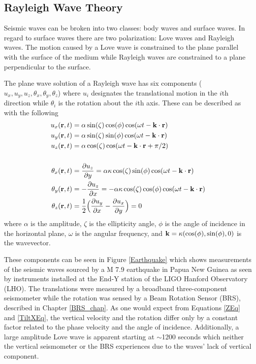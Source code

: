 \documentclass [12pt, proquest]{uwthesis}[2019]
\begin{document}
\subsection{Rayleigh Wave Theory}

Seismic waves can be broken into two classes: body waves and surface waves. In regard to surface waves there are two polarization: Love waves and Rayleigh waves. The motion caused by a Love wave is constrained to the plane parallel with the surface of the medium while Rayleigh waves are constrained to a plane perpendicular to the surface. 

The plane wave solution of a Rayleigh wave has six components ($u_x, u_y, u_z, \theta_x, \theta_y, \theta_z$) where $u_i$ designates the translational motion in the $i$th direction while $\theta_i$ is the rotation about the $i$th axis.
These can be described as with the following~\cite{seismic}
\begin{align}
u_x({\bf r} ,t)&=\alpha \sin(\zeta) \cos(\phi) \cos(\omega t-{\bf k}\cdot{\bf r})\label{XEq}\\
u_y({\bf r} ,t)&=\alpha \sin(\zeta) \sin(\phi) \cos(\omega t-{\bf k}\cdot{\bf r})\\
u_z({\bf r} ,t)&=\alpha \cos(\zeta) \cos(\omega t-{\bf k}\cdot{\bf r}+\pi/2)\label{ZEq}\\
\notag \\
\theta_x({\bf r} ,t)&=\frac{\partial u_z}{\partial y}=\alpha \kappa \cos(\zeta) \sin(\phi) \cos(\omega t-{\bf k}\cdot{\bf r})\label{TiltXEq}\\
\theta_y({\bf r} ,t)&=-\frac{\partial u_z}{\partial x}=-\alpha \kappa \cos(\zeta) \cos(\phi) \cos(\omega t-{\bf k}\cdot{\bf r})\\
\theta_z({\bf r} ,t)&=\frac{1}{2}\Big(\frac{\partial u_y}{\partial x}-\frac{\partial u_x}{\partial y}\Big)=0
\end{align}
where $\alpha$ is the amplitude, $\zeta$ is the ellipticity angle, $\phi$ is the angle of incidence in the horizontal plane, $\omega$ is the angular frequency, and $\bf{k}=\kappa (\cos(\phi),\sin(\phi),\text{0})$ is the wavevector.

These components can be seen in Figure \ref{Earthquake} which shows measurements of the seismic waves sourced by a M 7.9 earthquake in Papua New Guinea as seen by instruments installed at the End-Y station of the LIGO Hanford Observatory (LHO). The translations were measured by a broadband three-component seismometer while the rotation was sensed by a Beam Rotation Sensor (BRS), described in Chapter \ref{BRS_chap}. As one would expect from Equations \ref{ZEq} and \ref{TiltXEq}, the vertical velocity and the rotation differ only by a constant factor related to the phase velocity and the angle of incidence. Additionally, a large amplitude Love wave is apparent starting at $\sim$1200 seconds which neither the vertical seismometer or the BRS experiences due to the waves' lack of vertical component.
\end{document}
